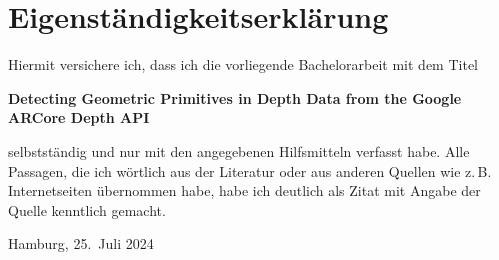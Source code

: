 
\printbibliography[category=inbib]


\appendix

%
%

\clearpage

\thispagestyle{empty}

\section*{Eigenständigkeitserklärung}

Hiermit versichere ich, dass ich die vorliegende Bachelorarbeit mit dem Titel
\begin{center}
    \textbf{
        Detecting Geometric Primitives
        in Depth Data from the
        Google ARCore Depth API
    }
\end{center}
selbstständig und nur mit den angegebenen Hilfsmitteln verfasst habe. Alle
Passagen, die ich wörtlich aus der Literatur oder aus anderen Quellen wie
z.\,B. Internetseiten übernommen habe, habe ich deutlich als Zitat mit Angabe
der Quelle kenntlich gemacht.

%
\vspace{2cm}
%

Hamburg, 25.\ Juli 2024
